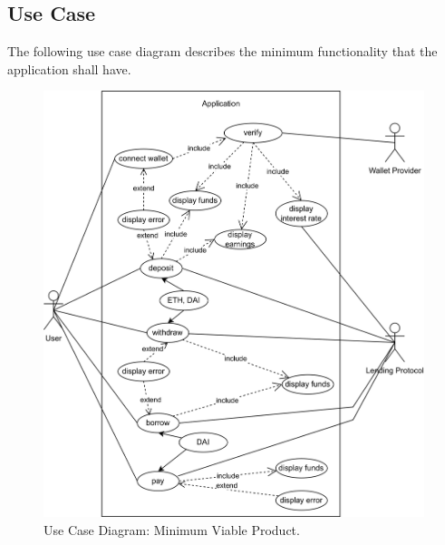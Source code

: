 \documentclass[11pt,a4paper]{report}
\begin{document}
\subsection{Use Case}
The following use case diagram describes the minimum functionality that the application shall have.
\begin{figure}[htp]
	\centering
	\includegraphics[width=0.99\textwidth]{./images/USECASE-full_nofl}
	\caption{Use Case Diagram: Minimum Viable Product.}
	\label{fig:usecase-mvp}
\end{figure}

\end{document}
